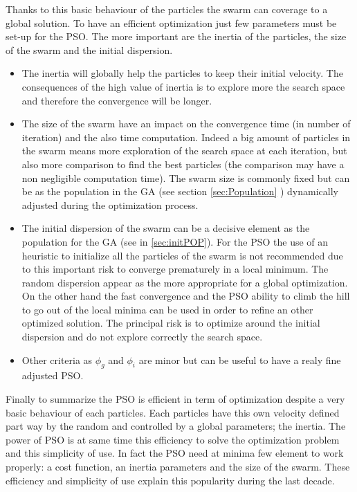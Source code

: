 Thanks to this basic behaviour of the particles the swarm can coverage to a global solution. 
To have an efficient optimization just few parameters must be set-up for the PSO.  
The more important are the inertia of the particles, the size of the swarm and the initial dispersion.
\begin{itemize}
\item The inertia will globally  help the particles to keep their initial velocity. The consequences of the high value of inertia is to explore more the search space and therefore the convergence will be longer. 
\item The size of the swarm  have an impact on the convergence time (in number of iteration) and the also time computation. Indeed a big amount of particles in the swarm  means more exploration of the search space at each iteration, but also more comparison to find the best particles (the comparison may have a non negligible computation time). 
The swarm size is commonly fixed but can be as the population in the GA (see section \ref{sec:Population} ) dynamically adjusted during the optimization process. 


\item The initial dispersion of the swarm can be a decisive element as the population for the GA (see in \ref{sec:initPOP}). For the PSO the use of an heuristic to initialize all the particles of the swarm is not recommended due to this important risk to converge prematurely in a local minimum. The random dispersion appear  as the more appropriate for a global optimization. On the other hand the fast convergence and the PSO ability to climb the hill to go out of the local minima can be used in order to refine an other optimized solution. The principal risk is to optimize around the initial dispersion and  do not explore correctly the search space.  
\item Other criteria as $\phi_g$ and $\phi_i$ are minor but can be useful to   have a realy fine adjusted PSO.
\end{itemize}

Finally to summarize the PSO is efficient in term of optimization despite a very basic behaviour of each particles. Each particles have this own velocity defined part way by the random and controlled by a global parameters; the inertia.
 The power of PSO is at same time this efficiency to solve the optimization problem and this simplicity of use. In fact the PSO need at minima  few element to work properly:
 a cost function, an inertia parameters and the size of the swarm. These efficiency and simplicity of use explain this popularity during the last decade.
 





